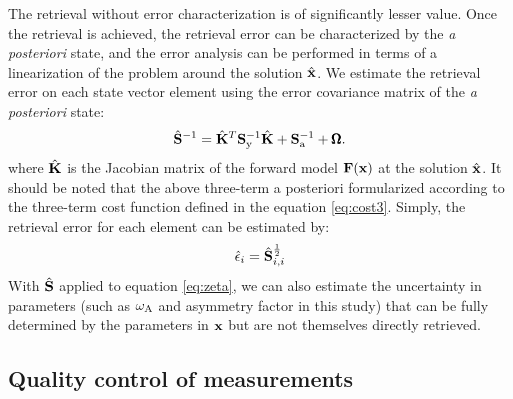 The retrieval without error characterization is of significantly lesser
value. Once the retrieval is achieved, the retrieval error can be
characterized by the \textit{a posteriori} state, and the error analysis 
can be performed in terms of a linearization of the problem around 
the solution $\hat{\mathbf{x}}$. We estimate the retrieval error on each 
state vector element using the error covariance matrix of the 
\textit{a posteriori} state:
\begin{equation}
\hat{\mathbf{S}}^{-1} = \hat{\mathbf{K}}^T\mathbf{S}_\text{y}^{-1}\hat{\mathbf{K}}+\mathbf{S}_\text{a}^{-1} +
\pmb{\Omega}. 
\label{eq:shat3}
\end{equation}
where $\hat{\mathbf{K}}$ is the Jacobian matrix of the forward model $\mathbf{F}(\mathbf{x})$ 
at the solution $\hat{\mathbf{x}}$. It should be noted that the above 
three-term a posteriori formularized according to the three-term cost 
function defined in the equation \eqref{eq:cost3}. Simply, the retrieval 
error for each element can be estimated by:
\begin{equation}
\hat{\epsilon}_i=\hat{\mathbf{S}}_{i,i}^{\frac{1}{2}}
\end{equation}
With $\hat{\mathbf{S}}$ applied to equation \eqref{eq:zeta}, we can also estimate
the uncertainty in parameters (such as $\omega_\text{A}$ and asymmetry factor in this
study) that can be fully determined by the parameters in $\mathbf{x}$ but are not
themselves directly retrieved.

\subsection{Quality control of measurements}
\label{subsec:alg-qaulity}

